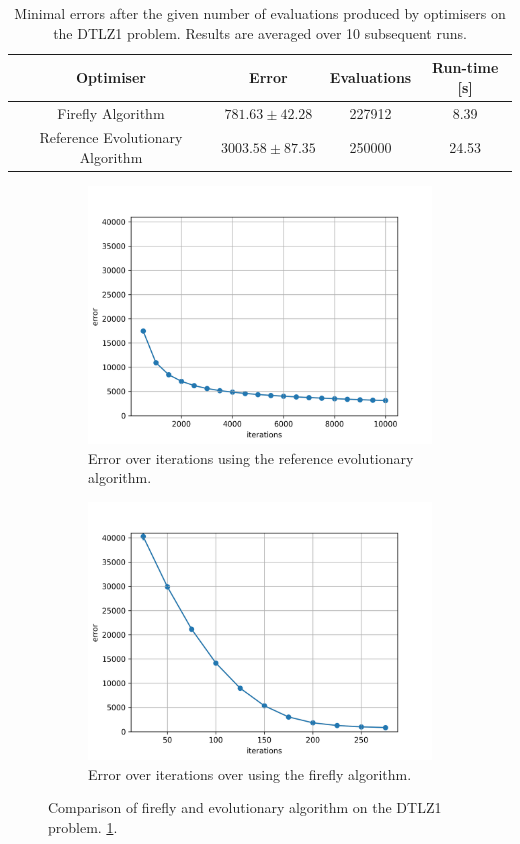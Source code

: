 \begin{table}[H]
  \centering
   \begin{tabular}{|c c c c|}
     \hline
     \textbf{Optimiser} & \textbf{Error} & \textbf{Evaluations} & \textbf{Run-time [s]} \\
     \hline
     Firefly Algorithm & $781.63 \pm 42.28$ & 227912 & 8.39 \\
     Reference Evolutionary Algorithm & $3003.58 \pm 87.35$ & 250000 & 24.53 \\
     \hline
  \end{tabular}
  \caption{Minimal errors after the given number of evaluations produced by optimisers on the DTLZ1 problem. Results are averaged over 10 subsequent runs.}
  \label{tab:firefly_vs_ea}
\end{table}

\begin{figure}
  \centering
  \begin{subfigure}{.5\textwidth}
    \centering
    \captionsetup{width=0.75\linewidth}
    \includegraphics[width=0.75\linewidth]{assets/reference_dtlz.png}
    \caption{Error over iterations using the reference evolutionary algorithm.}
    \label{fig:sub1}
  \end{subfigure}%
  \begin{subfigure}{.5\textwidth}
    \centering
    \captionsetup{width=0.75\linewidth}
    \includegraphics[width=0.75\linewidth]{assets/firefly_dtlz.png}
    \caption{Error over iterations over using the firefly algorithm.}
    \label{fig:sub2}
  \end{subfigure}
  \caption{Comparison of firefly and evolutionary algorithm on the DTLZ1 problem. \ref{tab:firefly_vs_ea}.}
  \label{fig:firefly_vs_ea}
\end{figure}

